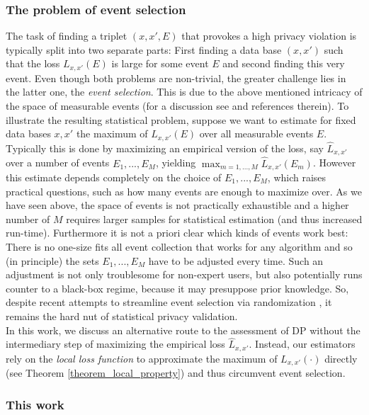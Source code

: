 \documentclass[conference]{IEEEtran}
\begin{document}
\subsubsection*{\textbf{The problem of event selection}}

The task of finding a triplet $(x,x',E)$ that provokes a high privacy violation is typically split into two separate parts: First finding a data base $(x,x')$ such that the loss $L_{x,x'}(E)$ is large for some event $E$ and second finding this very event. Even though both problems are non-trivial, the greater challenge lies in the latter one, the \textit{event selection}. This is due to the above mentioned intricacy of the space of measurable events (for a discussion see \cite{DP-Sniper} and references therein). To illustrate the resulting statistical problem, suppose we want to estimate for fixed data bases $x,x'$ the maximum of $L_{x,x'}(E)$ over all measurable events $E$.
Typically this is done by maximizing an empirical version of the loss, say $\hat L_{x,x'}$ over a number of events $E_1, ...,E_M$, yielding  $\max_{m=1,...,M}\hat L_{x,x'}(E_m) $. However this estimate depends completely on the choice of $E_1,...,E_M$, which raises practical questions, such as how many events are enough to maximize over. As we have seen above, the space of events is not practically exhaustible  and a higher number of $M$ requires larger samples for statistical estimation (and thus increased run-time). Furthermore it is not a priori clear which kinds of events work best: There is no one-size fits all event collection that works for any algorithm and so (in principle) the sets $E_1,...,E_M$ have to be adjusted every time. Such an adjustment is not only troublesome for non-expert users, but also potentially runs counter to a black-box regime, because it may presuppose prior knowledge. So, despite recent attempts to streamline event selection via randomization \cite{DP-Sniper}, it remains the hard nut of statistical privacy validation.\\
In this work, we discuss an alternative route to the assessment of DP without the intermediary step of maximizing the empirical loss $\hat L_{x,x'}$. Instead, our estimators rely on the  \textit{local loss function} to approximate the maximum of $L_{x,x'}(\cdot)$ directly (see Theorem \ref{theorem_local_property}) and thus circumvent event selection. 


\subsubsection*{\textbf{This work}}
\end{document}
